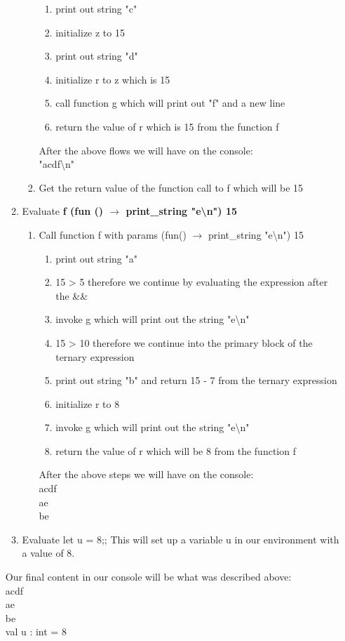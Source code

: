 \begin{enumerate}
\begin{enumerate}
\begin{enumerate}
\begin{enumerate}
				\item print out string "c" 
				
				\item initialize z to 15 
				
				\item print out string "d" 
				
				\item initialize r to z which is 15 
				
				\item call function g which will print out "f" and a new line 
				
				\item return the value of r which is 15 from the function f 
			\end{enumerate}
			After the above flows we will have on the console: \\
			 "acdf\textbackslash n"
			\item Get the return value of the function call to f which will be 15 
		\end{enumerate}
	\item Evaluate \textbf{f (fun () \(\rightarrow\) print\_string "e\textbackslash n") 15 }
		\begin{enumerate}
			\item Call function f with params (fun() \(\rightarrow\) print\_string "e\textbackslash n") 15 
			\begin{enumerate}
				\item print out string "a" 
				\item 15 > 5 therefore we continue by evaluating the expression after the \&\& 
				\item invoke g which will print out the string "e\textbackslash n" 
				\item 15 > 10 therefore we continue into the primary block of the ternary expression 
				\item print out string "b" and return 15 - 7 from the ternary expression 
				\item initialize r to 8 
				\item invoke g which will print out the string "e\textbackslash n" 
				\item return the value of r which will be 8 from the function f 
			\end{enumerate}
			After the above steps we will have on the console: \\
			acdf \\
			ae \\
			be \\
		\end{enumerate}
	\item{ Evaluate let u = 8;; }  This will set up a variable u in our environment with a value of 8.			
\end{enumerate}

Our final content in our console will be what was described above: \\
acdf\\
ae\\
be\\
val u : int = 8
\end{enumerate}




